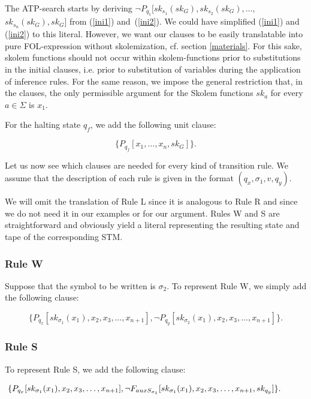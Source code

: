 \documentclass[%
  manuscript=article,   %
  year=2024,
  volume=77,
  doi=00000.000,
]{zfn}
\begin{document}
The ATP-search starts by deriving $\neg P_{q_1}[sk_{s_1}(sk_G),sk_{s_2}(sk_G), \ldots,$ $sk_{s_n}(sk_G), sk_G]$ from (\ref{ini1}) and~(\ref{ini2}). We could have simplified (\ref{ini1}) and (\ref{ini2}) to this literal. However, we want our clauses to be easily translatable into pure FOL-expression without skolemization, cf. section \ref{materials}. For this sake, skolem functions should not occur within skolem-functions prior to substitutions in the initial clauses, i.e. prior to substitution of variables during the application of inference rules. For the same reason,  we impose the general restriction that, in the clauses, the only permissible argument for the Skolem functions $sk_a$ for every $a \in \Sigma$ is $x_1$. \label{x1rest}

For the halting state $q_f$, we add the following unit clause:

\begin{equation}
\{P_{q_f}[x_1, ..., x_n, sk_G]\}.
\end{equation}

Let us now see which clauses are needed for every kind of transition rule. We assume that the description of each rule is given in the format $(q_x, \sigma_1, v, q_y)$.

We will omit the translation of Rule L since it is analogous to Rule R and since we do not need it in our examples or for our argument. Rules W and S are straightforward and obviously yield a literal representing the resulting state and tape of the corresponding STM.

\subsubsection{Rule W}

Suppose that the symbol to be written is $\sigma_2$. To represent Rule W, we simply add the following clause:

\begin{equation}
 \{P_{q_x}[sk_{\sigma_1}(x_1), x_2, x_3, \ldots, x_{n+1}],
 \neg P_{q_y}[sk_{\sigma_2}(x_1), x_2, x_3, \ldots, x_{n+1}]\}.
\end{equation}

\subsubsection{Rule S}

To represent Rule S, we add the following clause:

\begin{small}
\begin{equation}
\hspace{-0.95cm} \{P_{q_x}[sk_{\sigma_1}(x_1), x_2, x_3, \ldots, x_{n+1}],
 \neg F_{auxS_{\sigma_1}}[sk_{\sigma_1}(x_1), x_2, x_3, \ldots, x_{n+1}, sk_{q_y}]\}.
\end{equation}
\end{small}
\end{document}
